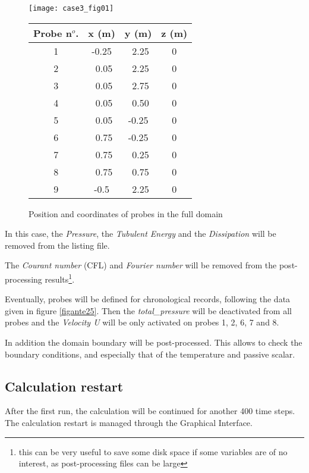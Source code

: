 \begin{figure}[htp]
\parbox{7cm}{%
\centerline{\texttt{[image: case3\_fig01]}}}
\parbox{7cm}{%
\begin{center}
\begin{tabular}{|c|c|c|c|}
\hline
Probe n$^o$. & x (m) & y (m) & z (m)\\
\hline
\hline
1 & -0.25 & ~2.25 & 0 \\
\hline
2 & ~0.05 & ~2.25 & 0 \\
\hline
3 & ~0.05 & ~2.75 & 0 \\
\hline
4 & ~0.05 & ~0.50 & 0 \\
\hline
5 & ~0.05 & -0.25 & 0 \\
\hline
6 & ~0.75 & -0.25 & 0 \\
\hline
7 & ~0.75 & ~0.25 & 0 \\
\hline
8 & ~0.75 & ~0.75 & 0 \\
\hline
9 & -0.5 & ~2.25 & 0 \\
\hline
\end{tabular}
\end{center}
}
\caption{Position and coordinates of probes in the full domain}
\label{figante32}
\end{figure}

In this case, the {\itshape Pressure}, the {\itshape Tubulent Energy} and the
{\itshape Dissipation} will be removed from the listing file.

The {\itshape Courant number} (CFL) and {\itshape Fourier number} will be
removed from the
post-processing results\footnote{this can be very useful to save some disk space
if some variables are of no interest, as post-processing files can be large}.

Eventually, probes will be defined for chronological records, following the data
given in figure \ref{figante25}. Then the {\itshape total\_pressure} will be
deactivated from all probes and the {\itshape Velocity U} will be only activated
on probes  1, 2, 6, 7 and 8.


In addition the domain boundary will be post-processed. This allows to check the
boundary conditions, and especially that of the temperature and passive scalar.


        \subsection{Calculation restart}

After the first run, the calculation will be continued for another 400 time
steps. The calculation restart is managed through the Graphical Interface.


